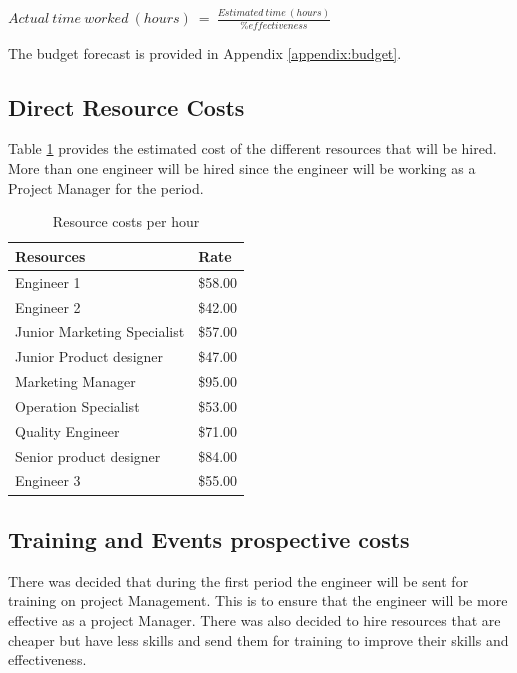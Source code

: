 \begin{center}
$ Actual\ time\ worked\ (hours)\ =\ \frac{Estimated\ time\ (hours)}{\% effectiveness} $
\end{center}

\noindent
The budget forecast is provided in Appendix \ref{appendix:budget}.

\subsection{Direct Resource Costs}

Table \ref{tab:resourcecosts} provides the estimated cost of the different resources that will be hired. More than one engineer will be hired since the engineer will be working as a Project Manager for the period.

\begin{table}[H]
\centering
\caption{Resource costs per hour}
\label{tab:resourcecosts}
\begin{tabular}{ll}
\textbf{Resources}          & \textbf{Rate} \\\hline
Engineer 1                  & \$58.00       \\
Engineer 2                  & \$42.00       \\
Junior Marketing Specialist & \$57.00       \\
Junior Product designer     & \$47.00       \\
Marketing Manager           & \$95.00       \\
Operation Specialist        & \$53.00       \\
Quality Engineer            & \$71.00       \\
Senior product designer     & \$84.00       \\
Engineer 3                  & \$55.00      
\end{tabular}
\end{table}

\subsection{Training and Events prospective costs}

There was decided that during the first period the engineer will be sent for training on project Management. This is to ensure that the engineer will be more effective as a project Manager. There was also decided to hire resources that are cheaper but have less skills and send them for training to improve their skills and effectiveness.\\

